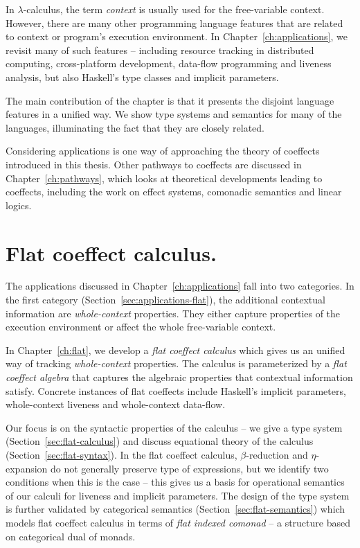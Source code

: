 In $\lambda$-calculus, the term \emph{context} is usually used for the free-variable context.
However, there are many other programming language features that are related to context or program's
execution environment. In Chapter~\ref{ch:applications}, we revisit many of such features --
including resource tracking in distributed computing, cross-platform development, data-flow 
programming and liveness analysis, but also Haskell's type classes and implicit parameters. 

The main contribution of the chapter is that it presents the disjoint language features in a 
unified way. We show type systems and semantics for many of the languages, illuminating
the fact that they are closely related. 

Considering applications is one way of approaching the theory of coeffects introduced in this thesis.
Other pathways to coeffects are discussed in Chapter~\ref{ch:pathways}, which looks at theoretical 
developments leading to coeffects, including the work on effect systems, comonadic semantics and 
linear logics.


\section{Flat coeffect calculus.}

The applications discussed in Chapter~\ref{ch:applications} fall into two categories. In the first
category (Section~\ref{sec:applications-flat}), the additional contextual information are 
\emph{whole-context} properties. They either capture properties of the execution environment or
affect the whole free-variable context.

In Chapter~\ref{ch:flat}, we develop a \emph{flat coeffect calculus} which gives us an unified way
of tracking \emph{whole-context} properties. The calculus is parameterized by a \emph{flat coeffect
algebra} that captures the algebraic properties that contextual information satisfy. Concrete 
instances of flat coeffects include Haskell's implicit parameters, whole-context liveness and
whole-context data-flow. 

Our focus is on the syntactic properties of the calculus -- we give a type system 
(Section~\ref{sec:flat-calculus}) and discuss equational theory of the calculus (Section~\ref{sec:flat-syntax}).
In the flat coeffect calculus, $\beta$-reduction and $\eta$-expansion do not generally preserve
type of expressions, but we identify two conditions when this is the case -- this gives us
a basis for operational semantics of our calculi for liveness and implicit parameters. 
The design of the type system is further validated by categorical semantics
(Section~\ref{sec:flat-semantics}) which models flat coeffect calculus in terms of 
\emph{flat indexed comonad} -- a structure based on categorical dual of monads.

